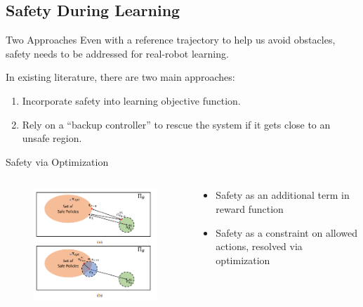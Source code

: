 \documentclass{beamer}
\begin{document}
\subsection{Safety During Learning}

\begin{frame}{Two Approaches}
  Even with a reference trajectory to help us avoid obstacles, safety needs to
  be addressed for real-robot learning.
  
  In existing literature, there are two main approaches:
  \begin{enumerate}
      \item Incorporate safety into learning objective function.
      \item Rely on a ``backup controller'' to rescue the system if it gets
        close to an unsafe region.
  \end{enumerate}
\end{frame}

\begin{frame}{Safety via Optimization}
  \begin{columns}
    \begin{column}{0.5\textwidth}
    \begin{figure}
      \centering
      \includegraphics[width=\linewidth]{assets/policy_projection.png}
    \end{figure}
  \end{column}

  \begin{column}{0.5\textwidth}
    \begin{itemize}
      \item Safety as an additional term in reward function
      \item Safety as a constraint on allowed actions, resolved via optimization 
    \end{itemize}
  \end{column}
  \end{columns}

\end{frame}
\end{document}
